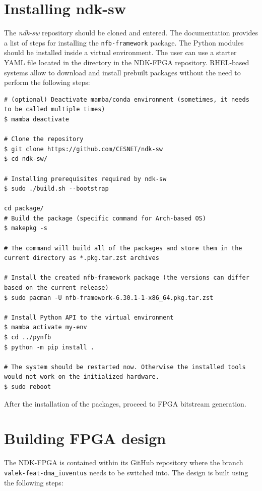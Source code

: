 \section{Installing ndk-sw}

The \emph{ndk-sw} repository\cite{ndk_sw_github} should be cloned and entered. The documentation
provides a list of steps for installing the \verb|nfb-framework| package. The Python modules should
be installed inside a virtual environment. The user can use a starter YAML file located in the
 directory in the NDK-FPGA repository. RHEL-based systems allow to download
and install prebuilt packages without the need to perform the following steps:

\begin{lstlisting}[caption={Installing the NDK-SW package and Python modules}]
# (optional) Deactivate mamba/conda environment (sometimes, it needs to be called multiple times)
$ mamba deactivate

# Clone the repository
$ git clone https://github.com/CESNET/ndk-sw
$ cd ndk-sw/

# Installing prerequisites required by ndk-sw
$ sudo ./build.sh --bootstrap

cd package/
# Build the package (specific command for Arch-based OS)
$ makepkg -s

# The command will build all of the packages and store them in the current directory as *.pkg.tar.zst archives

# Install the created nfb-framework package (the versions can differ based on the current release)
$ sudo pacman -U nfb-framework-6.30.1-1-x86_64.pkg.tar.zst

# Install Python API to the virtual environment
$ mamba activate my-env
$ cd ../pynfb
$ python -m pip install .

# The system should be restarted now. Otherwise the installed tools would not work on the initialized hardware.
$ sudo reboot
\end{lstlisting}

After the installation of the packages, proceed to FPGA bitstream generation.

\section{Building FPGA design}

The NDK-FPGA is contained within its GitHub repository\cite{ndk_fpga_iuventus_branch} where the
branch \verb|valek-feat-dma_iuventus| needs to be switched into. The design is built using the following
steps:

